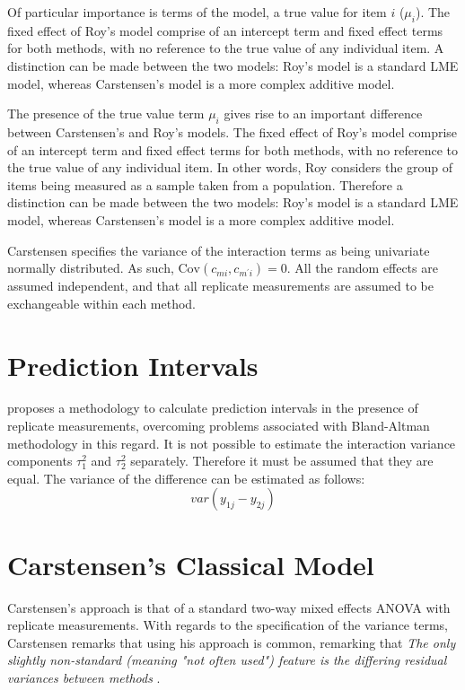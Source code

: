 \documentclass[12pt, a4paper]{report}
\theoremstyle{plain}
\theoremstyle{definition}
\theoremstyle{remark}
\begin{document}
Of particular importance is terms of the model, a true value for item $i$ ($\mu_{i}$).  The fixed effect of Roy's model comprise of an intercept term and fixed effect terms for both methods, with no reference to the true value of any individual item. A distinction can be made between the two models: Roy's model is a standard LME model, whereas Carstensen's model is a more complex additive model.


The presence of the true value term $\mu_i$ gives rise to an important difference between Carstensen's and Roy's models. The fixed effect of Roy's model comprise of an intercept term and fixed effect terms for both methods, with no reference to the true value of any individual item. In other words, Roy considers the group of items being measured as a sample taken from a population. Therefore a distinction can be made between the two models: Roy's model is a standard LME model, whereas Carstensen's model is a more complex additive model.

Carstensen specifies the variance of the interaction terms as being univariate normally distributed. As such, $\mathrm{Cov}(c_{mi}, c_{m^\prime i})= 0.$ All the random effects are assumed independent, and that all replicate measurements are assumed to be exchangeable within each method.




	\section{Prediction Intervals}

\citet{BXC2008} proposes a methodology to calculate prediction
intervals in the presence of replicate measurements, overcoming
problems associated with Bland-Altman methodology in this regard.
It is not possible to estimate the interaction variance components
$\tau^{2}_{1}$ and $\tau^{2}_{2}$ separately. Therefore it must be
assumed that they are equal. The variance of the difference can be
estimated as follows:
\begin{equation}
var(y_{1j}-y_{2j})
\end{equation}




\section{Carstensen's Classical Model}
Carstensen's approach is that of a standard two-way mixed effects ANOVA with replicate measurements. With regards to the specification of the variance terms, Carstensen remarks that using his approach is common, remarking that \emph{
	The only slightly non-standard (meaning "not often used") feature is the differing residual variances between methods }\citep{BXC2010}.
\end{document}
